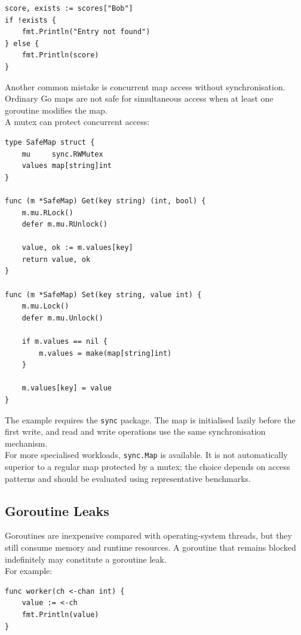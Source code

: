 \begin{lstlisting}
score, exists := scores["Bob"]
if !exists {
    fmt.Println("Entry not found")
} else {
    fmt.Println(score)
}
\end{lstlisting}

Another common mistake is concurrent map access without synchronisation. Ordinary Go maps are not safe for simultaneous access when at least one goroutine modifies the map.\\

A mutex can protect concurrent access:

\begin{lstlisting}
type SafeMap struct {
    mu     sync.RWMutex
    values map[string]int
}

func (m *SafeMap) Get(key string) (int, bool) {
    m.mu.RLock()
    defer m.mu.RUnlock()

    value, ok := m.values[key]
    return value, ok
}

func (m *SafeMap) Set(key string, value int) {
    m.mu.Lock()
    defer m.mu.Unlock()

    if m.values == nil {
        m.values = make(map[string]int)
    }

    m.values[key] = value
}
\end{lstlisting}

The example requires the \texttt{sync} package. The map is initialised lazily before the first write, and read and write operations use the same synchronisation mechanism.\\

For more specialised workloads, \texttt{sync.Map} is available. It is not automatically superior to a regular map protected by a mutex; the choice depends on access patterns and should be evaluated using representative benchmarks.

\subsection{Goroutine Leaks}

Goroutines are inexpensive compared with operating-system threads, but they still consume memory and runtime resources. A goroutine that remains blocked indefinitely may constitute a goroutine leak.\\

For example:

\begin{lstlisting}
func worker(ch <-chan int) {
    value := <-ch
    fmt.Println(value)
}
\end{lstlisting}

